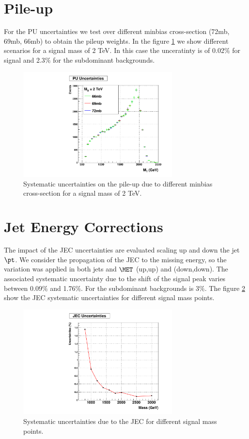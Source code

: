\section{Pile-up}

For the PU uncertainties we test over different minbias cross-section (72mb, 69mb, 66mb) to obtain the pileup weights. In the figure \ref{fig:PUuncert}  we show different scenarios for a signal mass of 2 TeV. In this case the unceratinty is of 0.02$\%$ for signal and 2.3$\%$ for the subdominant backgrounds. 

\begin{figure}[!ht]
\caption{ Systematic uncertainties on the pile-up due to different minbias cross-section for a signal mass of 2 TeV.}
\begin{center}
  \includegraphics[width=230pt]{figures/SystUncert/UncertPU.pdf}
\end{center}
\label{fig:PUuncert}
\end{figure}


\section{Jet Energy Corrections}

The impact of the JEC uncertainties are evaluated scaling up and down the jet $\pt$. We consider the propagation of the JEC to the missing energy, so the variation was applied in both jets and $\MET$ (up,up) and (down,down). The associated systematic uncertainty due to the shift of the signal peak varies between 0.09$\%$ and 1.76$\%$. For the subdominant backgrounds is 3$\%$. The figure \ref{fig:JECuncert} show the JEC systematic uncertainties for different signal mass points.
\begin{figure}[!ht]
\caption{ Systematic uncertainties due to the JEC for different signal mass points.}
\begin{center}
  \includegraphics[width=230pt]{figures/SystUncert/UncertJEC.pdf}
\end{center}
\label{fig:JECuncert}
\end{figure}

